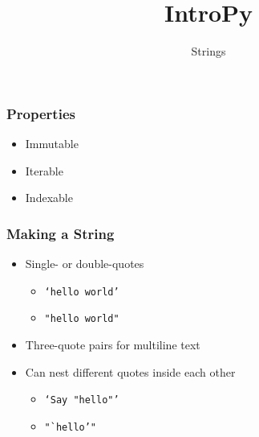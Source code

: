 \documentclass{beamer}
\title{IntroPy}
\subtitle{Strings}
\begin{document}
\frame{\titlepage}


%
%
\begin{frame}
  \frametitle{Properties}
  \begin{itemize}
    \item Immutable
    \item Iterable
    \item Indexable
  \end{itemize}
\end{frame}


%
%
\begin{frame}
  \frametitle{Making a String}
  \begin{itemize}
    \item Single- or double-quotes
      \begin{itemize}
        \item \texttt{`hello world'} 
	\item \texttt{"hello world"}
      \end{itemize}

    \item Three-quote pairs for multiline text

    \item Can nest different quotes inside each other
      \begin{itemize}
        \item \texttt{`Say "hello"'} 
	\item \texttt{"`hello'"}
      \end{itemize}
  \end{itemize}
\end{frame}
\end{document}
